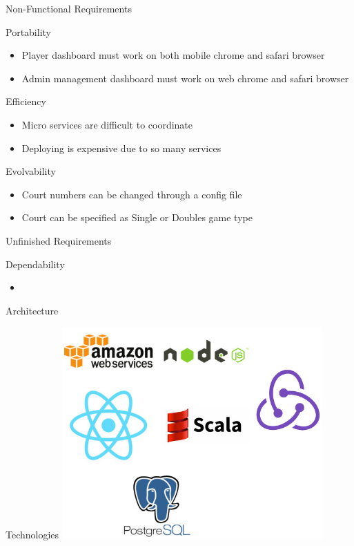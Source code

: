 \documentclass{beamer}
\begin{document}
\begin{frame}
\Huge Non-Functional Requirements
\end{frame}

\begin{frame}{Portability}
\begin{itemize}
\item Player dashboard must work on both mobile chrome and safari browser
\item Admin management dashboard must work on web chrome and safari browser
\end{itemize}
\end{frame}

\begin{frame}{Efficiency}
\begin{itemize}
\item Micro services are difficult to coordinate
\item Deploying is expensive due to so many services
\end{itemize}
\end{frame}

\begin{frame}{Evolvability}
\begin{itemize}
\item Court numbers can be changed through a config file
\item Court can be specified as Single or Doubles game type
\end{itemize}
\end{frame}

\begin{frame}
\Huge Unfinished Requirements
\end{frame}

\begin{frame}{Dependability}
\begin{itemize}
\item
\end{itemize}
\end{frame}

\begin{frame}
\Huge Architecture
\end{frame}

\begin{frame}{Technologies}
\includegraphics[width=10cm]{logos.jpg}
\end{frame}
\end{document}
